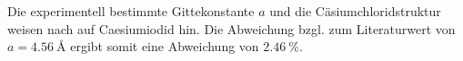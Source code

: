 Die experimentell bestimmte Gittekonstante $a$ und die Cäsiumchloridstruktur weisen nach \cite{CsJ} auf Caesiumiodid hin. Die Abweichung bzgl. zum Literaturwert von $a=\SI{4.56}{\angstrom}$ ergibt somit eine Abweichung von $\SI{2.46}{\percent}$.



%
%
%     
%
%
